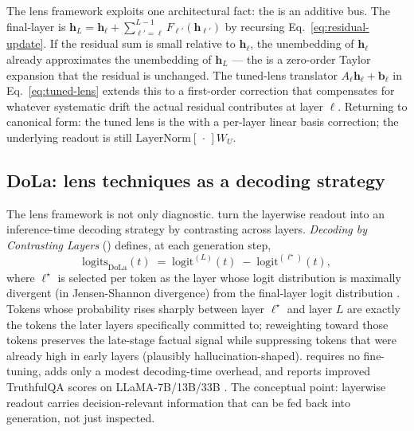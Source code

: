 \begin{intuition}
The lens framework exploits one architectural fact: the 
is an additive bus. The final-layer  is
$\mathbf{h}_L = \mathbf{h}_\ell + \sum_{\ell'=\ell}^{L-1} F_{\ell'}(\mathbf{h}_{\ell'})$
by recursing Eq.~\eqref{eq:residual-update}. If the residual sum is
small relative to $\mathbf{h}_\ell$, the unembedding of $\mathbf{h}_\ell$
already approximates the unembedding of $\mathbf{h}_L$ — the 
is a zero-order Taylor expansion that the residual is unchanged. The
tuned-lens translator
$A_\ell \mathbf{h}_\ell + \mathbf{b}_\ell$ in
Eq.~\eqref{eq:tuned-lens} extends this to a first-order correction
that compensates for whatever systematic drift the actual residual
contributes at layer $\ell$. Returning to canonical form: the tuned
lens is the  with a per-layer linear basis correction; the
underlying readout is still $\mathrm{LayerNorm}[\,\cdot\,]W_U$.
\end{intuition}

\subsection{DoLa: lens techniques as a decoding strategy}
\label{sec:dola}

The lens framework is not only diagnostic. \citet{chuang2023-dola}
turn the layerwise readout into an inference-time decoding strategy by
contrasting  across layers. \emph{Decoding by Contrasting Layers}
() defines, at each generation step,
\begin{equation}
  \mathrm{logits}_{\mathrm{DoLa}}(t)
  \;=\;
  \mathrm{logit}^{(L)}(t) \;-\; \mathrm{logit}^{(\ell^\star)}(t),
  \label{eq:dola}
\end{equation}
where $\ell^\star$ is selected per token as the layer whose logit
distribution is maximally divergent (in Jensen-Shannon divergence) from
the final-layer logit distribution \citep{chuang2023-dola}. Tokens
whose probability rises sharply between layer $\ell^\star$ and layer
$L$ are exactly the tokens the later layers specifically committed to;
reweighting toward those tokens preserves the late-stage factual
signal while suppressing tokens that were already high in early layers
(plausibly hallucination-shaped).  requires no fine-tuning, adds
only a modest decoding-time overhead, and reports improved TruthfulQA
scores on LLaMA-7B/13B/33B \citep{chuang2023-dola}. The conceptual
point: layerwise readout carries decision-relevant information that
can be fed back into generation, not just inspected.

